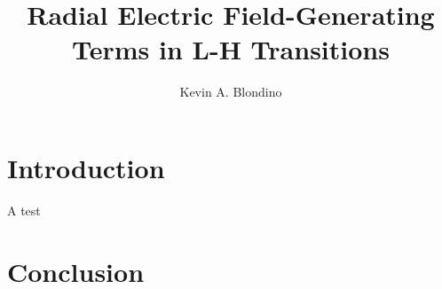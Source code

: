 \documentclass{article}
\author{Kevin A. Blondino}
\title{Radial Electric Field-Generating Terms in L-H Transitions}
\date{}
\begin{document}
\maketitle
\section{Introduction}
A test \cite{freidberg_ideal_1987}
\section{Conclusion}



\nocite{*}

\end{document}
